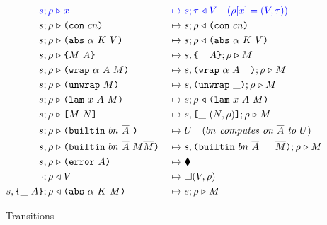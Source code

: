 \begin{figure*}[!ht]
\begin{subfigure}[c]{\linewidth}  %
{
\small
\caption{Transitions}
    \begin{alignat*}{2}
     \blue{s; \rho} &\bcompute \blue{x}          &{}\bmapsto{}&\blue{s;\tau \return V \quad (\rho[x] = (V,\tau))}\\  %
      s; \rho &\compute \con{cn}                 &{}\mapsto{}& s;\rho \return \con{cn}\\
      s; \rho &\compute \abs{\alpha}{K}{V}       &{}\mapsto{}& s;\rho \return \abs{\alpha}{K}{V}\\
      s; \rho &\compute \inst{M}{A}              &{}\mapsto{}& s,\inInstLeftFrame{A};\rho \compute M\\
      s; \rho &\compute \wrap{\alpha}{A}{M}      &{}\mapsto{}& s,\inWrapRightFrame{\alpha}{A};\rho  \compute M\\ 
      s; \rho &\compute \unwrap{M}               &{}\mapsto{}& s,\inUnwrapFrame{};\rho  \compute M\\
      s; \rho &\compute \lam{x}{A}{M}            &{}\mapsto{}& s;\rho \return \lam{x}{A}{M}\\
      s; \rho &\compute \app{M}{N}               &{}\mapsto{}& s,\inAppLeftFrame{(N,\rho)};\rho \compute M\\
      s; \rho &\compute \builtin{bn}{\repetition{A}}{} &{}\mapsto{}& U \quad (\textit{$bn$ computes on $\repetition{A}$ to $U$})\\
      s; \rho &\compute \builtin{bn}{\repetition{A}}{M \repetition{M}} &{}\mapsto{}& s,\inBuiltin{bn}{\repetition{A}}{}{\_}{\repetition{M}};\rho \compute M\\
      s; \rho &\compute \error{A} &{}\mapsto{}& \ckerror{}\\
      \cdot; \rho &\return V &{}\mapsto{}& \square (V, \rho)\\
      s,\inInstLeftFrame{A}; \rho &\return \abs{\alpha}{K}{M} &{}\mapsto{}& s;\rho \compute{M} \\

\end{alignat*}}
\end{subfigure}
\end{figure*}

